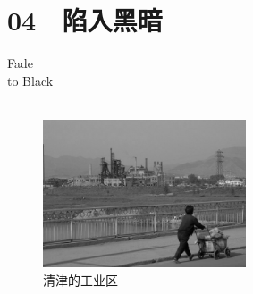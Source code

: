 \fancyhead[RO]{{\tiny{\textcolor{Gray}{\FA \ }}}\thepage}
\fancyhead[LE]{{\tiny{\textcolor{Gray}{\FA \ }}}\thepage}
\fancyfoot[LE,RO]{}
\fancyfoot[LO,CE]{}
\fancyfoot[CO,RE]{}
\chapter*{04 {\FA } 陷入黑暗}
\vspace{5mm}
\begin{flushright}
	\textcolor{PinYinColor}{\EN \huge{Fade\\
	to Black\\
	\ \\}}
\end{flushright}

\begin{figure}[!htbp]
	\centering
	\includegraphics[width=6cm]{./Chapters/Images/04.jpg}
	\caption*{清津的工业区}
\end{figure}

